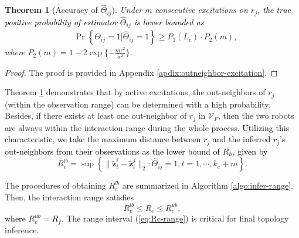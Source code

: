 \documentclass[12pt,journal,draftclsnofoot,onecolumn]{IEEEtran}
\newtheorem{theorem}{Theorem}
\let \sss=\scriptscriptstyle
\begin{document}
\begin{theorem}[Accuracy of $\hat{\Theta}_{ij}$]\label{th:outneighbor-excitation}
Under $m$ consecutive excitations on $r_j$, \textcolor{black}{the true positive probability of estimator $\hat{\Theta}_{ij}$ is lower bounded as }
\begin{align}\label{eq:neighbor-iden}
&\Pr\left\{ {\Theta}_{ij}=1 |\hat{\Theta}_{ij}=1 \right\} \ge P_1(L_c)\cdot P_2(m),
\end{align}
where $P_2(m)=1 - 2 \exp\{-\frac{ {m}\epsilon^{2}}{\sigma^{2}}\}$. 
\end{theorem}
\begin{proof}
The proof is provided in Appendix \ref{apdix:outneighbor-excitation}. 
\end{proof}


Theorem \ref{th:outneighbor-excitation} demonstrates that by active excitations, the out-neighbors of $r_j$ (within the observation range) can be determined with a high probability. 
Besides, if there exists at least one out-neighbor of $r_j$ in $\mathcal{V}_{\sss F}$, then the two robots are always within the interaction range during the whole process. 
\textcolor{black}{Utilizing this characteristic, we take the maximum distance between $r_j$ and the inferred $r_j$'s out-neighbors from their observations as the lower bound of $R_h$, given by}
\begin{equation}\label{eq:range-bound}
R_c^{lb} \!=\! \sup \left\{ \| \tilde{\mathbf{z}}_{t}^{i}- \tilde{ \mathbf{z} }_{t}^{j} \|_2 : \hat{\Theta}_{ij}=1, t=1,\!\cdots\!,k_e \! +\! m \right\}. \!
\end{equation}

The procedures of obtaining $R_c^{lb}$ are summarized in Algorithm \ref{algo:infer-range}. 
Then, the interaction range satisfies 
\begin{equation}\label{eq:Rc-range}
R_c^{lb}\le R_c\le R_c^{ub}, 
\end{equation}
\textcolor{black}{where $R_c^{ub}=R_f$}. 
The range interval (\ref{eq:Rc-range}) is critical for final topology inference. 
\end{document}
